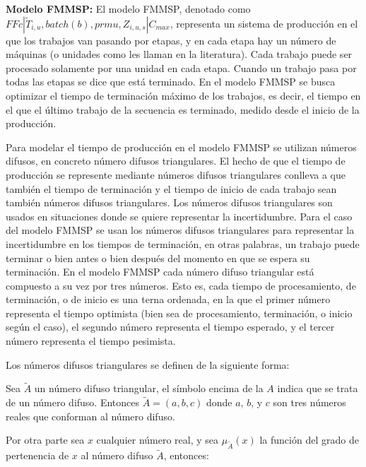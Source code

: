 \documentclass{article}
\def\notac_modelo{$FFc | \tilde{T}_{i, u}, batch(b), prmu, Z_{i, u, s} | C_{max}$}
\begin{document}
\vspace{\baselineskip}
\textbf{Modelo FMMSP:} El modelo FMMSP, denotado como \linebreak \notac_modelo, representa un sistema de producción en el que los trabajos van pasando por etapas, y en cada etapa hay un número de máquinas (o unidades como les llaman en la literatura). Cada trabajo puede ser procesado solamente por una unidad en cada etapa. Cuando un trabajo pasa por todas las etapas se dice que está terminado. En el modelo FMMSP se busca optimizar el tiempo de terminación máximo de los trabajos, es decir, el tiempo en el que el último trabajo de la secuencia es terminado, medido desde el inicio de la producción. \autocite{modFMMSP}

\vspace{\baselineskip}
Para modelar el tiempo de producción en el modelo FMMSP se utilizan números difusos, en concreto número difusos triangulares. El hecho de que el tiempo de producción se represente mediante números difusos triangulares conlleva a que también el tiempo de terminación y el tiempo de inicio de cada trabajo sean también números difusos triangulares. Los números difusos triangulares son usados en situaciones donde se quiere representar la incertidumbre. Para el caso del modelo FMMSP se usan los números difusos triangulares para representar la incertidumbre en los tiempos de terminación, en otras palabras, un trabajo puede terminar o bien antes o bien después del momento en que se espera su terminación. En el modelo FMMSP cada número difuso triangular está compuesto a su vez por tres números. Esto es, cada tiempo de procesamiento, de terminación, o de inicio es una terna ordenada, en la que el primer número representa el tiempo optimista (bien sea de procesamiento, terminación, o inicio según el caso), el segundo número representa el tiempo esperado, y el tercer número representa el tiempo pesimista. \autocite{modFMMSP}

\vspace{\baselineskip}
Los números difusos triangulares se definen de la siguiente forma: \autocite{fuzzyNum}

\vspace{\baselineskip}
Sea $\tilde{A}$ un número difuso triangular, el símbolo encima de la $A$ indica que se trata de un número difuso. Entonces $\tilde{A} = (a,b,c)$ donde $a$, $b$, y $c$ son tres números reales que conforman al número difuso.

Por otra parte sea $x$ cualquier número real, y sea $\mu_{\tilde{A}}(x)$ la función del grado de pertenencia de $x$ al número difuso $\tilde{A}$, entonces:
\end{document}
